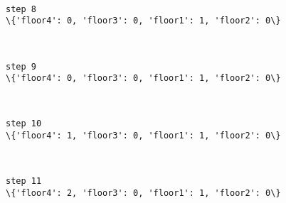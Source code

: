 \documentclass[11pt]{article}
\begin{document}
    \begin{center}
    \end{center}
    { \hspace*{\fill} \\}
    
    \begin{Verbatim}[commandchars=\\\{\}]
step 8
\{'floor4': 0, 'floor3': 0, 'floor1': 1, 'floor2': 0\}

    \end{Verbatim}

    \begin{center}
    \end{center}
    { \hspace*{\fill} \\}
    
    \begin{Verbatim}[commandchars=\\\{\}]
step 9
\{'floor4': 0, 'floor3': 0, 'floor1': 1, 'floor2': 0\}

    \end{Verbatim}

    \begin{center}
    \end{center}
    { \hspace*{\fill} \\}
    
    \begin{Verbatim}[commandchars=\\\{\}]
step 10
\{'floor4': 1, 'floor3': 0, 'floor1': 1, 'floor2': 0\}

    \end{Verbatim}

    \begin{center}
    \end{center}
    { \hspace*{\fill} \\}
    
    \begin{Verbatim}[commandchars=\\\{\}]
step 11
\{'floor4': 2, 'floor3': 0, 'floor1': 1, 'floor2': 0\}

    \end{Verbatim}
\end{document}
